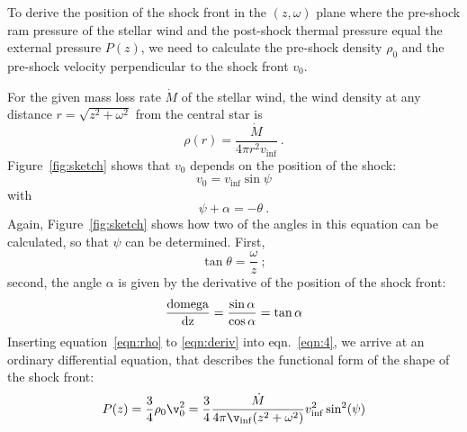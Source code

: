 To derive the position of the shock front in the $(z, \omega)$ plane where the pre-shock ram pressure of the stellar wind and the post-shock thermal pressure equal the external pressure $P(z)$, we need to calculate the pre-shock density $\rho_0$ and the pre-shock velocity perpendicular to the shock front $v_0$.

For the given mass loss rate $\dot M$ of the stellar wind, the wind density at any distance $r=\sqrt{z^2+\omega^2}$ from the central star is 
\begin{equation}\label{eqn:rho}
\rho(r) = \frac{\dot M}{4 \pi r^2 v_{\inf}}\ .
\end{equation}
Figure~\ref{fig:sketch} shows that $v_0$ depends on the position of the shock:
\begin{equation}\label{eqn:v0}
v_0 = v_{\inf} \sin \psi
\end{equation}
with 
\begin{equation}\label{eqn:angle}
\psi+\alpha = - \theta \ .
\end{equation}
Again, Figure~\ref{fig:sketch} shows how two of the angles in this equation can be calculated, so that $\psi$ can be determined. First,
\begin{equation}
\tan\theta = \frac{\omega}{z}\ ;
\end{equation}
second, the angle $\alpha$ is given by the derivative of the position of the shock front:
\begin{equation}\label{eqn:deriv}
\frac{\rm{d}omega}{\rm{d}z} = \frac{\sin \alpha}{\cos \alpha} = \tan{\alpha}
\end{equation}
Inserting equation~\ref{eqn:rho} to \ref{eqn:deriv} into eqn.~\ref{eqn:4}, we arrive at an ordinary differential equation, that describes the functional form of the shape of the shock front:
\begin{equation}
P(z) = \frac{3}{4}\rho_0\v_0^2 = \frac{3}{4} \frac{\dot{M}}{4\pi\v_{\inf}(z^2+\omega^2)} v_{\inf}^2 \sin^2(\psi)
\end{equation}
